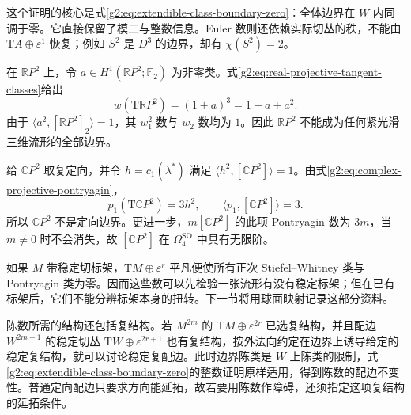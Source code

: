 这个证明的核心是式\eqref{g2:eq:extendible-class-boundary-zero}：全体边界在 \(W\) 内同调于零。它直接保留了模二与整数信息。Euler 数则还依赖实际切丛的秩，不能由 \(\mathrm TA\oplus\varepsilon^1\) 恢复；例如 \(S^2\) 是 \(D^3\) 的边界，却有 \(\chi(S^2)=2\)。

\begin{example}\label{g2:exm:projective-bordism-obstructions}
	在 \(\mathbb RP^2\) 上，令 \(a\in H^1(\mathbb RP^2;\mathbb F_2)\) 为非零类。式\eqref{g2:eq:real-projective-tangent-classes}给出
	\[
		w(\mathrm T\mathbb RP^2)=(1+a)^3=1+a+a^2.
	\]
	由于 \(\langle a^2,[\mathbb RP^2]_2\rangle=1\)，其 \(w_1^2\) 数与 \(w_2\) 数均为 \(1\)。因此 \(\mathbb RP^2\) 不能成为任何紧光滑三维流形的全部边界。

	给 \(\mathbb CP^2\) 取复定向，并令 \(h=c_1(\lambda^*)\) 满足 \(\langle h^2,[\mathbb CP^2]\rangle=1\)。由式\eqref{g2:eq:complex-projective-pontryagin}，
	\[
		p_1(\mathrm T\mathbb CP^2)=3h^2,\qquad
		\langle p_1,[\mathbb CP^2]\rangle=3.
	\]
	所以 \(\mathbb CP^2\) 不是定向边界。更进一步，\(m[\mathbb CP^2]\) 的此项 Pontryagin 数为 \(3m\)，当 \(m\ne0\) 时不会消失，故 \([\mathbb CP^2]\) 在 \(\Omega_4^{\mathrm{SO}}\) 中具有无限阶。
\end{example}

如果 \(M\) 带稳定切标架，\(\mathrm TM\oplus\varepsilon^r\) 平凡便使所有正次 Stiefel--Whitney 类与 Pontryagin 类为零。因而这些数可以先检验一张流形有没有稳定标架；但在已有标架后，它们不能分辨标架本身的扭转。下一节将用球面映射记录这部分资料。

陈数所需的结构还包括复结构。若 \(M^{2m}\) 的 \(\mathrm TM\oplus\varepsilon^{2r}\) 已选复结构，并且配边 \(W^{2m+1}\) 的稳定切丛 \(\mathrm TW\oplus\varepsilon^{2r+1}\) 也有复结构，按外法向约定在边界上诱导给定的稳定复结构，就可以讨论稳定复配边。此时边界陈类是 \(W\) 上陈类的限制，式\eqref{g2:eq:extendible-class-boundary-zero}的整数证明原样适用，得到陈数的配边不变性。普通定向配边只要求方向能延拓，故若要用陈数作障碍，还须指定这项复结构的延拓条件。
